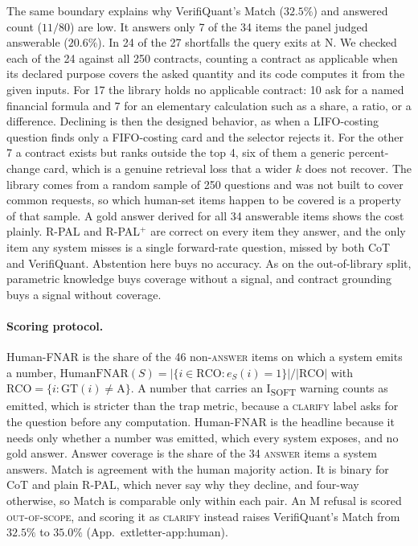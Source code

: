 \documentclass[sigconf]{acmart}
\newif\ifarxiv
\newcommand{\extref}[1]{App.~\ifarxiv\ref{#1}\else\csname extletter-#1\endcsname\fi}
\begin{document}
The same boundary explains why VerifiQuant's Match ($32.5\%$) and answered count ($11/80$) are low. It answers only 7 of the 34 items the panel judged answerable ($20.6\%$). In 24 of the 27 shortfalls the query exits at N. We checked each of the 24 against all 250 contracts, counting a contract as applicable when its declared purpose covers the asked quantity and its code computes it from the given inputs. For 17 the library holds no applicable contract: 10 ask for a named financial formula and 7 for an elementary calculation such as a share, a ratio, or a difference. Declining is then the designed behavior, as when a LIFO-costing question finds only a FIFO-costing card and the selector rejects it. For the other 7 a contract exists but ranks outside the top 4, six of them a generic percent-change card, which is a genuine retrieval loss that a wider $k$ does not recover. The library comes from a random sample of 250 questions and was not built to cover common requests, so which human-set items happen to be covered is a property of that sample.
A gold answer derived for all 34 answerable items shows the cost plainly. R-PAL and R-PAL$^{+}$ are correct on every item they answer, and the only item any system misses is a single forward-rate question, missed by both CoT and VerifiQuant. Abstention here buys no accuracy.
As on the out-of-library split, parametric knowledge buys coverage without a signal, and contract grounding buys a signal without coverage.

\paragraph{Scoring protocol.}
Human-FNAR is the share of the 46 non-\textsc{answer} items on which a system emits a number, $\mathrm{HumanFNAR}(S)=|\{i\in\mathrm{RCO}: e_S(i){=}1\}|/|\mathrm{RCO}|$ with $\mathrm{RCO}=\{i:\mathrm{GT}(i)\neq\text{A}\}$. A number that carries an I\textsubscript{SOFT} warning counts as emitted, which is stricter than the trap metric, because a \textsc{clarify} label asks for the question before any computation. Human-FNAR is the headline because it needs only whether a number was emitted, which every system exposes, and no gold answer. Answer coverage is the share of the 34 \textsc{answer} items a system answers. Match is agreement with the human majority action. It is binary for CoT and plain R-PAL, which never say why they decline, and four-way otherwise, so Match is comparable only within each pair. An M refusal is scored \textsc{out-of-scope}, and scoring it as \textsc{clarify} instead raises VerifiQuant's Match from $32.5\%$ to $35.0\%$ (\extref{app:human}).
\end{document}
